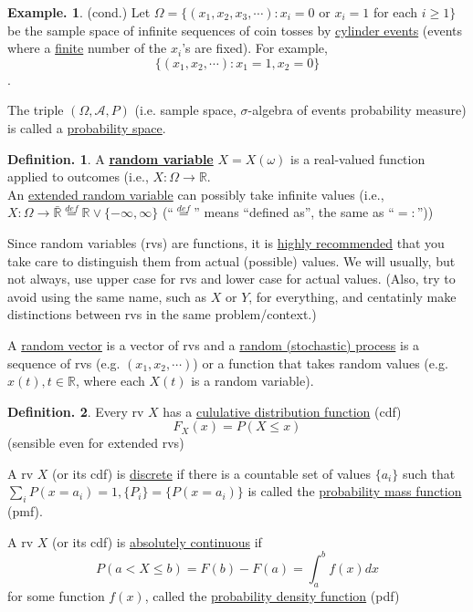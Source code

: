 \documentclass[12pt]{article}
\theoremstyle{definition}
\newtheorem{mydef}{Definition.}[section]
\newtheorem{myexp}{Example.}[section]
\theoremstyle{plain}
\begin{document}
\begin{myexp}
(cond.) Let $\Omega = \{(x_1, x_2, x_3, \cdots): x_i = 0$ or $x_i = 1$ for each $i \geq 1\}$ be the sample space of infinite sequences of coin tosses by \underline{cylinder events} (events where a \underline{finite} number of the $x_i$'s are fixed). For example, \[\{(x_1, x_2, \cdots) : x_1 = 1, x_2 = 0\}\].
\end{myexp}
The triple $(\Omega, \mathcal{A}, P)$ (i.e. sample space, $\sigma$-algebra of events probability measure) is called a \underline{probability space}. 

\begin{mydef}
A \underline{\textbf{random variable}} $X = X(\omega)$ is a real-valued function applied to outcomes (i.e., $X: \Omega \rightarrow \mathbb{R}$. \\
An \underline{extended random variable} can possibly take infinite values (i.e., $X: \Omega \rightarrow \bar{\mathbb{R}} \stackrel{def}{=} \mathbb{R} \vee \{-\infty, \infty\}$ (``$\stackrel{def}{=}$'' means ``defined as'', the same as ``$=:$''))
\end{mydef}


Since random variables (rvs) are functions, it is \underline{highly recommended} that you take care to distinguish them from actual (possible) values. We will usually, but not always, use upper case for rvs and lower case for actual values. (Also, try to avoid using the same name, such as $X$ or $Y$, for everything, and centatinly make distinctions between rvs in the same problem/context.) 

A \underline{random vector} is a vector of rvs and a \underline{random (stochastic) process} is a sequence of rvs (e.g. $(x_1, x_2, \cdots)$) or a function that takes random values (e.g. $x(t), t \in \mathbb{R}$, where each $X(t)$ is a random variable).

\begin{mydef}
Every rv $X$ has a \underline{cululative distribution function} (cdf) \[F_X(x) = P(X \leq x)\] (sensible even for extended rvs)
\end{mydef}

A rv $X$ (or its cdf) is \underline{discrete} if there is a countable set of values $\{a_i\}$ such that $\sum_i P(x = a_i) = 1, \{P_i\}=\{P(x = a_i)\}$ is called the \underline{probability mass function} (pmf). 

A rv $X$ (or its cdf) is \underline{absolutely continuous} if \[P(a < X \leq b) = F(b) - F(a) = \int_a^b f(x)dx\] for some function $f(x)$, called the \underline{probability density function} (pdf) 
\end{document}
